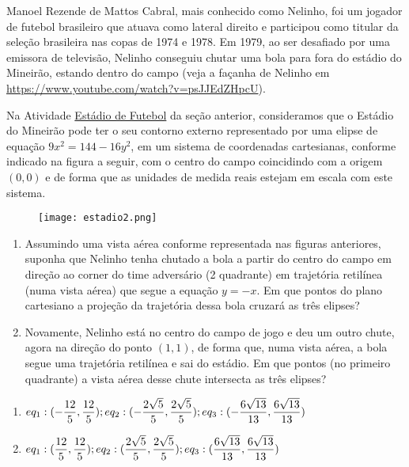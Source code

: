 \documentclass[10 pt,usenames,dvipsnames, oneside]{article}
\begin{document}
Manoel Rezende de Mattos Cabral, mais conhecido como Nelinho, foi um jogador de futebol brasileiro que atuava como lateral direito e participou como titular da seleção brasileira nas copas de 1974 e 1978. Em 1979, ao ser desafiado por uma emissora de televisão, Nelinho conseguiu chutar uma bola para fora do estádio do Mineirão, estando dentro do campo (veja a façanha de Nelinho em \url{https://www.youtube.com/watch?v=psJJEdZHpcU}).


Na Atividade \hyperref[estadio]{Estádio de Futebol} da seção anterior, consideramos que o Estádio do Mineirão pode ter o seu contorno externo representado por uma elipse de equação $9x^2 = 144 - 16y^2$, em um sistema de coordenadas cartesianas, conforme indicado na figura a seguir, com o centro do campo coincidindo com a origem $(0,0)$ e de forma que as unidades de medida reais estejam em escala com este sistema.

\begin{figure}[H]
\centering

\noindent\texttt{[image: estadio2.png]}
\end{figure}
\begin{enumerate} 

\item{}
Assumindo uma vista aérea conforme representada nas figuras anteriores, suponha que Nelinho tenha chutado a bola a partir do centro do campo em direção ao corner do time adversário (2 quadrante) em trajetória retilínea (numa vista aérea) que segue a equação $y = -x$. Em que pontos do plano cartesiano a projeção da trajetória dessa bola cruzará as três elipses?

\item{}
Novamente, Nelinho está no centro do campo de jogo e deu um outro chute, agora na direção do ponto $(1,1)$, de forma que, numa vista aérea, a bola segue uma trajetória retilínea e sai do estádio. Em que pontos (no primeiro quadrante) a vista aérea desse chute intersecta as três elipses?

\end{enumerate}

\ifdefined\prof
\begin{solucao}

\begin{enumerate}
\item $\displaystyle eq_1:(-\frac{12}{5},\frac{12}{5} );\ \newline eq_2:(-\frac{2\sqrt{5}}{5},\frac{2\sqrt{5}}{5});\  \newline eq_3:(-\frac{6\sqrt{13}}{13},\frac{6\sqrt{13}}{13})$
\item $\displaystyle eq_1:(\frac{12}{5},\frac{12}{5} );\ \newline eq_2:(\frac{2\sqrt{5}}{5},\frac{2\sqrt{5}}{5});\  \newline eq_3:(\frac{6\sqrt{13}}{13},\frac{6\sqrt{13}}{13})$
\end{enumerate}

\end{solucao}
\fi
\end{document}
